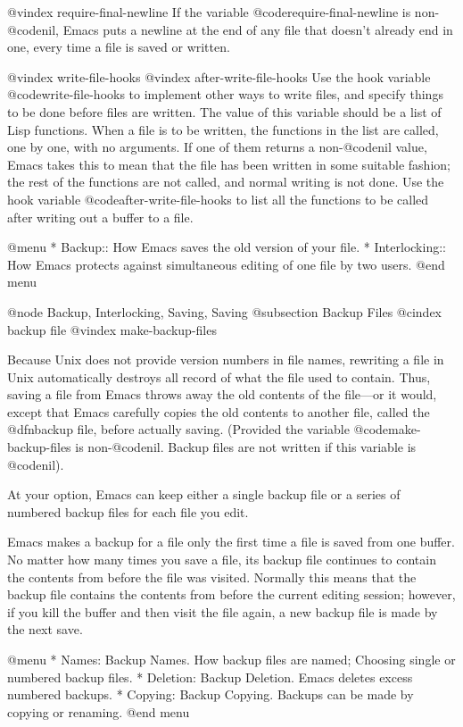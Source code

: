 {{{{{{{{{{{{{{{{@vindex require-final-newline
  If the variable @code{require-final-newline} is non-@code{nil}, Emacs
puts a newline at the end of any file that doesn't already end in one,
every time a file is saved or written.

@vindex write-file-hooks
@vindex after-write-file-hooks
  Use the hook variable @code{write-file-hooks} to implement other ways
to write files, and specify things to be done before files are written.  The
value of this variable should be a list of Lisp functions.  When a file
is to be written, the functions in the list are called, one by one, with
no arguments.  If one of them returns a non-@code{nil} value, Emacs
takes this to mean that the file has been written in some suitable
fashion; the rest of the functions are not called, and normal writing is
not done. Use the hook variable @code{after-write-file-hooks} to list
all the functions to be called after writing out a buffer to a file.

@menu
* Backup::       How Emacs saves the old version of your file.
* Interlocking:: How Emacs protects against simultaneous editing
                  of one file by two users.
@end menu

@node Backup, Interlocking, Saving, Saving
@subsection Backup Files
@cindex backup file
@vindex make-backup-files

  Because Unix does not provide version numbers in file names, rewriting a
file in Unix automatically destroys all record of what the file used to
contain.  Thus, saving a file from Emacs throws away the old contents of
the file---or it would, except that Emacs carefully copies the old contents
to another file, called the @dfn{backup} file, before actually saving.
(Provided the variable @code{make-backup-files} is non-@code{nil}.
Backup files are not written if this variable is @code{nil}).

  At your option, Emacs can keep either a single backup file or a series of
numbered backup files for each file you edit.

  Emacs makes a backup for a file only the first time a file is saved
from one buffer.  No matter how many times you save a file, its backup file
continues to contain the contents from before the file was visited.
Normally this means that the backup file contains the contents from before
the current editing session; however, if you kill the buffer and then visit
the file again, a new backup file is made by the next save.

@menu
* Names: Backup Names.		How backup files are named;
				Choosing single or numbered backup files.
* Deletion: Backup Deletion.	Emacs deletes excess numbered backups.
* Copying: Backup Copying.	Backups can be made by copying or renaming.
@end menu

}}}}}}}}}}}}}}}}
